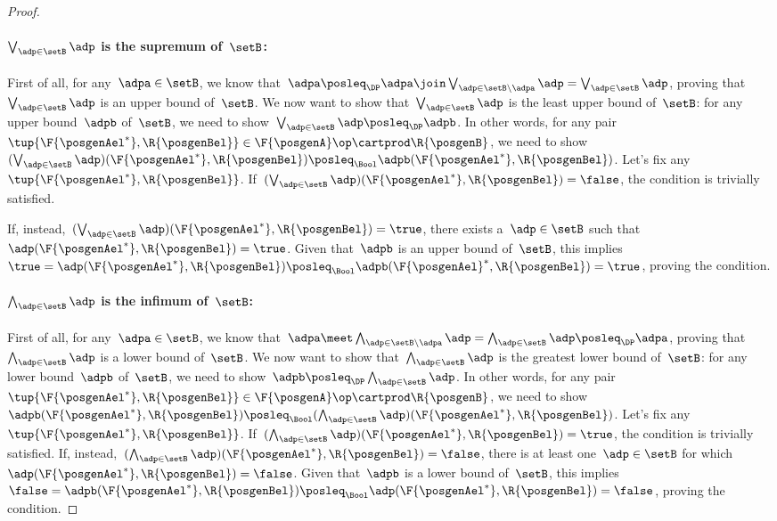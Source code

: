 \begin{proof}
    \paragraph*{$\bigvee_{\adp \in \setB} \adp$ is the supremum of~$\setB$:}
    First of all, for any~$\adpa\in \setB$, we know that~$\adpa\posleq_\DP \adpa \join \bigvee_{\adp \in \setB \backslash \adpa} \adp= \bigvee_{\adp \in \setB} \adp$, proving that~$\bigvee_{\adp \in \setB} \adp$ is an upper bound of~$\setB$.
    We now want to show that~$\bigvee_{\adp \in \setB} \adp$ is the least upper bound of~$\setB$: for any upper bound~$\adpb$ of~$\setB$, we need to show~$\bigvee_{\adp \in \setB} \adp \posleq_\DP\adpb$.
    In other words, for any pair~$\tup{\F{\posgenAel^*},\R{\posgenBel}}\in \F{\posgenA}\op\cartprod \R{\posgenB}$, we need to show~$(\bigvee_{\adp \in \setB} \adp)(\F{\posgenAel^*},\R{\posgenBel})\posleq_\Bool \adpb(\F{\posgenAel^*},\R{\posgenBel})$.
    Let's fix any~$\tup{\F{\posgenAel^*},\R{\posgenBel}}$.
    If~$(\bigvee_{\adp \in \setB} \adp)(\F{\posgenAel^*},\R{\posgenBel})=\false$, the condition is trivially satisfied.

    If, instead,~$(\bigvee_{\adp \in \setB} \adp)(\F{\posgenAel^*},\R{\posgenBel})=\true$, there exists a~$\adp\in \setB$ such that~$\adp(\F{\posgenAel^*},\R{\posgenBel})=\true$.
    Given that~$\adpb$ is an upper bound of~$\setB$, this implies~$\true=\adp(\F{\posgenAel^*},\R{\posgenBel})\posleq_\Bool \adpb(\F{\posgenAel}^*,\R{\posgenBel})=\true$, proving the condition.

    \paragraph*{$\bigwedge_{\adp \in \setB} \adp$ is the infimum of~$\setB$:}
    First of all, for any~$\adpa\in \setB$, we know that~$\adpa \meet \bigwedge_{\adp \in \setB \backslash \adpa} \adp= \bigwedge_{\adp \in \setB} \adp \posleq_\DP \adpa$, proving that~$\bigwedge_{\adp \in \setB} \adp$ is a lower bound of~$\setB$.
    We now want to show that~$\bigwedge_{\adp \in \setB} \adp$ is the greatest lower bound of~$\setB$: for any lower bound~$\adpb$ of~$\setB$, we need to show~$\adpb\posleq_\DP\bigwedge_{\adp \in \setB} \adp $.
    In other words, for any pair~$\tup{\F{\posgenAel^*},\R{\posgenBel}}\in \F{\posgenA}\op\cartprod \R{\posgenB}$, we need to show~$\adpb(\F{\posgenAel^*},\R{\posgenBel}) \posleq_\Bool (\bigwedge_{\adp \in \setB} \adp)(\F{\posgenAel^*},\R{\posgenBel})$.
    Let's fix any~$\tup{\F{\posgenAel^*},\R{\posgenBel}}$.
    If~$(\bigwedge_{\adp \in \setB} \adp)(\F{\posgenAel^*},\R{\posgenBel})=\true$, the condition is trivially satisfied.
    If, instead,~$(\bigwedge_{\adp \in \setB} \adp)(\F{\posgenAel^*},\R{\posgenBel})=\false$, there is at least one~$\adp\in \setB$ for which~$\adp(\F{\posgenAel^*},\R{\posgenBel})=\false$.
    Given that~$\adpb$ is a lower bound of~$\setB$, this implies~$\false=\adpb(\F{\posgenAel^*},\R{\posgenBel})\posleq_\Bool \adp(\F{\posgenAel^*},\R{\posgenBel})=\false$, proving the condition.
\end{proof}

